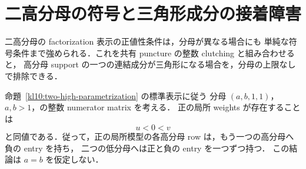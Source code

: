 
\section{二高分母の符号と三角形成分の接着障害}
\label{ls11:section}

二高分母の factorization 表示の正値性条件は，分母が異なる場合にも
単純な符号条件まで強められる．これを共有 puncture の整数 clutching と組み合わせると，
高分母 support の一つの連結成分が三角形になる場合を，分母の上限なしで排除できる．

\begin{theorem}[二高分母の正値性と符号]\label{ls11:two-high-signs}
命題~\ref{kl10:two-high-parametrization} の標準表示に従う
分母 $(a,b,1,1)$，$a,b>1$，の整数 numerator matrix を考える．
正の局所 weights が存在することは
\[
 u<0<v
\]
と同値である．従って，正の局所模型の各高分母 row は，もう一つの高分母へ負の entry を持ち，
二つの低分母へは正と負の entry を一つずつ持つ．
この結論は $a=b$ を仮定しない．
\end{theorem}

